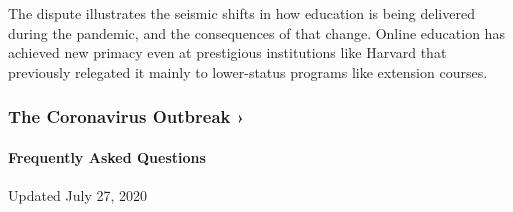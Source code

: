 The dispute illustrates the seismic shifts in how education is being
delivered during the pandemic, and the consequences of that change.
Online education has achieved new primacy even at prestigious
institutions like Harvard that previously relegated it mainly to
lower-status programs like extension courses.

\href{https://www.nytimes.com/news-event/coronavirus?action=click\&pgtype=Article\&state=default\&region=MAIN_CONTENT_3\&context=storylines_faq}{}

\hypertarget{the-coronavirus-outbreak-}{%
\subsubsection{The Coronavirus Outbreak
›}\label{the-coronavirus-outbreak-}}

\hypertarget{frequently-asked-questions}{%
\paragraph{Frequently Asked
Questions}\label{frequently-asked-questions}}

Updated July 27, 2020

